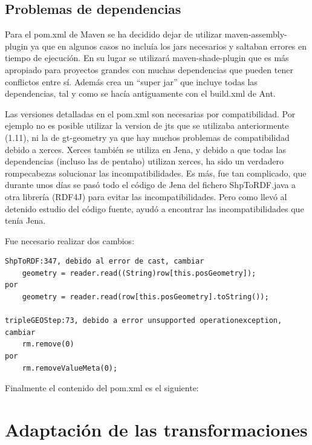 \subsection{Problemas de dependencias}

Para el pom.xml de Maven se ha decidido dejar de utilizar maven-assembly-plugin ya que en algunos casos no
incluía los jars necesarios y saltaban errores en tiempo de ejecución. En su lugar se utilizará
maven-shade-plugin que es más apropiado para proyectos grandes con muchas dependencias que pueden tener
conflictos entre sí. Además crea un ``super jar'' que incluye todas las dependencias, tal y como se hacía antiguamente
con el build.xml de Ant.

Las versiones detalladas en el pom.xml son necesarias por compatibilidad. Por ejemplo no es posible utilizar la
version de jts que se utilizaba anteriormente (1.11), ni la de gt-geometry ya que hay muchos problemas de compatibilidad debido a
xerces. Xerces también se utiliza en Jena, y debido a que todas las dependencias (incluso las de pentaho) utilizan
xerces, ha sido un verdadero rompecabezas solucionar las incompatibilidades. Es más, fue tan complicado, que
durante unos días se pasó todo el código de Jena del fichero ShpToRDF.java a otra librería (RDF4J) para evitar
las incompatibilidades. Pero como llevó al detenido estudio del código fuente, ayudó a encontrar las
incompatibilidades que tenía Jena.

Fue necesario realizar dos cambios: 

\begin{lstlisting}
ShpToRDF:347, debido al error de cast, cambiar
    geometry = reader.read((String)row[this.posGeometry]);
por 
    geometry = reader.read(row[this.posGeometry].toString());

tripleGEOStep:73, debido a error unsupported operationexception, cambiar
    rm.remove(0)
por
    rm.removeValueMeta(0);
\end{lstlisting}

Finalmente el contenido del pom.xml es el siguiente:




\section{Adaptación de las transformaciones}

